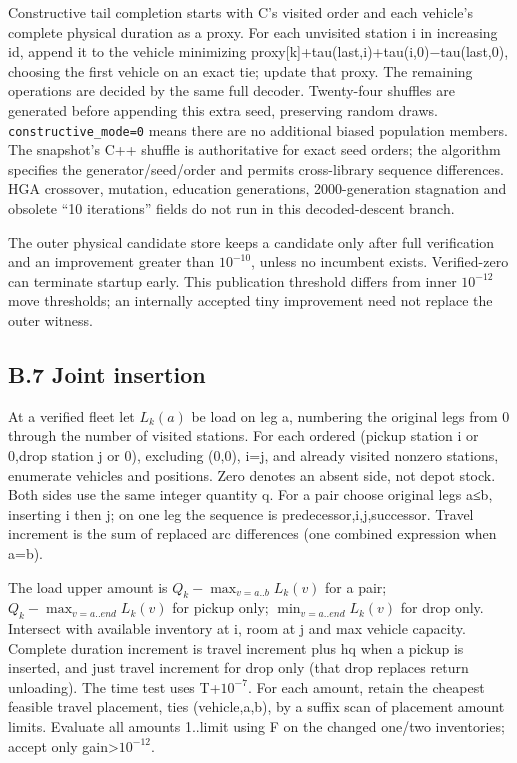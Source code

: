 \documentclass[
  american,
  11pt,
]{article}
\begin{document}
Constructive tail completion starts with C's visited order and each
vehicle's complete physical duration as a proxy. For each unvisited
station i in increasing id, append it to the vehicle minimizing
proxy{[}k{]}+tau(last,i)+tau(i,0)−tau(last,0), choosing the first
vehicle on an exact tie; update that proxy. The remaining operations are
decided by the same full decoder. Twenty-four shuffles are generated
before appending this extra seed, preserving random draws.
\texttt{constructive\_\allowbreak{}mode=0} means there are no
additional biased population members. The snapshot's C++ shuffle is
authoritative for exact seed orders; the algorithm specifies the
generator/seed/order and permits cross-library sequence differences. HGA
crossover, mutation, education generations, 2000-generation stagnation
and obsolete ``10 iterations'' fields do not run in this decoded-descent
branch.

The outer physical candidate store keeps a candidate only after full
verification and an improvement greater than \(10^{-10}\), unless no
incumbent exists. Verified-zero can terminate startup early. This
publication threshold differs from inner \(10^{-12}\) move thresholds;
an internally accepted tiny improvement need not replace the outer
witness.

\subsection{B.7 Joint insertion}\label{b.7-joint-insertion}

At a verified fleet let \(L_k(a)\) be load on leg a, numbering the
original legs from 0 through the number of visited stations. For each
ordered (pickup station i or 0,drop station j or 0), excluding (0,0),
i=j, and already visited nonzero stations, enumerate vehicles and
positions. Zero denotes an absent side, not depot stock. Both sides use
the same integer quantity q. For a pair choose original legs a≤b,
inserting i then j; on one leg the sequence is
predecessor,i,j,successor. Travel increment is the sum of replaced arc
differences (one combined expression when a=b).

The load upper amount is \(Q_k-\max_{v=a..b}L_k(v)\) for a pair;
\(Q_k-\max_{v=a..end}L_k(v)\) for pickup only; \(\min_{v=a..end}L_k(v)\)
for drop only. Intersect with available inventory at i, room at j and
max vehicle capacity. Complete duration increment is travel increment
plus hq when a pickup is inserted, and just travel increment for drop
only (that drop replaces return unloading). The time test uses
T+\(10^{-7}\). For each amount, retain the cheapest feasible travel
placement, ties (vehicle,a,b), by a suffix scan of placement amount
limits. Evaluate all amounts 1..limit using F on the changed one/two
inventories; accept only gain\textgreater{}\(10^{-12}\).
\end{document}
